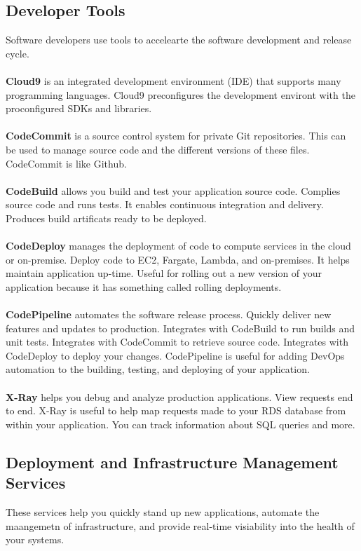\documentclass{article}%
\begin{document}
\subsection{Developer Tools}
Software developers use tools to accelearte the software development and release cycle.  \\ \\
\textbf{Cloud9} is an integrated development environment (IDE) that supports many programming languages. Cloud9 preconfigures the development environt with the proconfigured SDKs and libraries. \\ \\
\textbf{CodeCommit} is a source control system for private Git repositories. This can be used to manage source code and the different versions of these files. CodeCommit is like Github. \\ \\
\textbf{CodeBuild} allows you build and test your application source code. Complies source code and runs tests. It enables continuous integration and delivery. Produces build artificats ready to be deployed. \\ \\
\textbf{CodeDeploy} manages the deployment of code to compute services in the cloud or on-premise. Deploy code to EC2, Fargate, Lambda, and on-premises. It helps maintain application up-time. Useful for rolling out a new version of your application because it has something called rolling deployments. \\ \\
\textbf{CodePipeline} automates the software release process. Quickly deliver new features and updates to production. Integrates with CodeBuild to run builds and unit tests. Integrates with CodeCommit to retrieve source code. Integrates with CodeDeploy to deploy your changes. CodePipeline is useful for adding DevOps automation to the building, testing, and deploying of your application. \\ \\
\textbf{X-Ray} helps you debug and analyze production applications. View requests end to end. X-Ray is useful to help map requests made to your RDS database from within your application. You can track information about SQL queries and more.
\subsection{Deployment and Infrastructure Management Services}
These services help you quickly stand up new applications, automate the maangemetn of infrastructure, and provide real-time visiability into the health of your systems.
\end{document}
